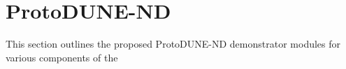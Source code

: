 \section{ProtoDUNE-ND}
\label{sec:protodune-nd}

This section outlines the proposed ProtoDUNE-ND demonstrator modules for various components of the 
